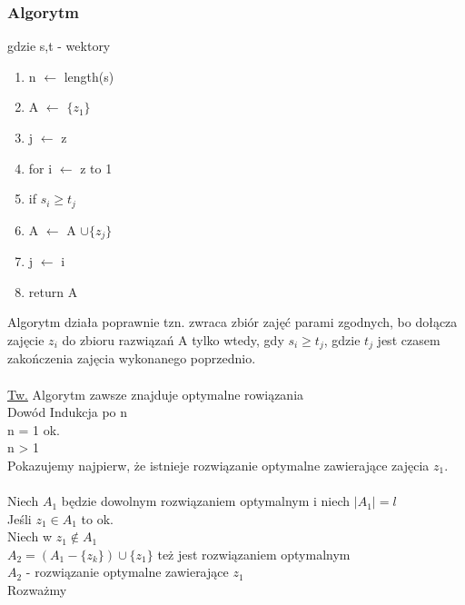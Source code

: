 \subsubsection{Algorytm}
gdzie s,t - wektory
\begin{enumerate}
	\item n $\leftarrow$ length(s)
    \item A $\leftarrow$ $\lbrace z_1 \rbrace$
    \item j $\leftarrow$ z
    \item for i $\leftarrow$ z to 1
    \item \tab if $s_i \geq t_j$ 
    \item \tab \tab A $\leftarrow$ A $\cup \lbrace z_j \rbrace$
    \item \tab \tab j $\leftarrow$ i
    \item return A
\end{enumerate}
Algorytm działa poprawnie tzn. zwraca zbiór zajęć parami zgodnych, bo dołącza zajęcie $z_i$ do zbioru razwiązań A tylko wtedy, gdy $s_i \geq t_j$, gdzie $t_j$ jest czasem zakończenia zajęcia wykonanego poprzednio.\\
\\
\underline{Tw.} Algorytm zawsze znajduje optymalne rowiązania\\
Dowód Indukcja po n\\
\tab n = 1 ok.\\
\tab n > 1\\
Pokazujemy najpierw, że istnieje rozwiązanie optymalne zawierające zajęcia $z_1$.\\
\\
Niech $A_1$ będzie dowolnym rozwiązaniem optymalnym i niech $\vert A_1\vert = l$\\
Jeśli $z_1 \in A_1$ to ok. \\
Niech w $z_1 \not\in A_1$ \\
$A_2 = (A_1 - \lbrace z_k\rbrace ) \cup \lbrace z_1 \rbrace $ też jest rozwiązaniem optymalnym \\
$A_2$ - rozwiązanie optymalne zawierające $z_1$\\
Rozważmy 
